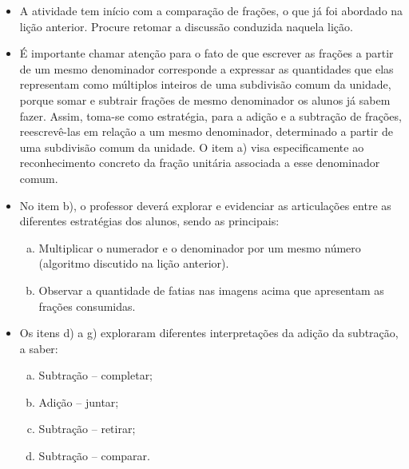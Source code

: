 \begin{multicols}{2}
\begin{orientacoes}{}{}
\begin{itemize}
   \item  A atividade tem início com a comparação de frações, o que já foi abordado na lição anterior. Procure retomar a discussão conduzida naquela lição.
   \item  É importante chamar atenção para o fato de que escrever as frações a partir de um mesmo denominador corresponde a expressar as quantidades que elas representam como múltiplos inteiros de uma subdivisão comum da unidade, porque somar e subtrair frações de mesmo denominador os alunos já sabem fazer. Assim, toma-se como estratégia, para a adição e a subtração de frações, reescrevê-las em relação a um mesmo denominador, determinado a partir de uma subdivisão comum da unidade. O item a) visa especificamente ao reconhecimento concreto da fração unitária associada a esse denominador comum.
   \item  No item b), o professor deverá explorar e evidenciar as articulações entre as diferentes estratégias dos alunos, sendo as principais:
   \begin{enumerate}[a)]
   \item  Multiplicar o numerador e o denominador por um mesmo número (algoritmo discutido na lição anterior).
   \item  Observar a quantidade de fatias nas imagens acima que apresentam as frações consumidas.
   \end{enumerate}
   \item  Os itens d) a g) exploraram diferentes interpretações da adição da subtração, a saber:
   \begin{enumerate}[a)]
\item Subtração – completar;
\item Adição – juntar;
\item Subtração – retirar;
\item Subtração – comparar.
   \end{enumerate}

 \end{itemize}
 \end{orientacoes}



\end{multicols}
